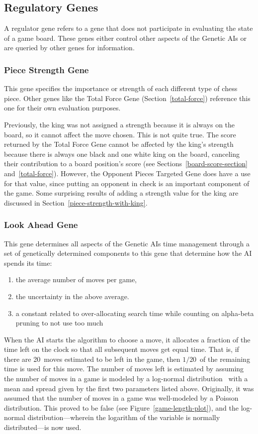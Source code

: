 \documentclass[letterpaper]{article}
\renewcommand{\_}{\allowbreak\textunderscore\allowbreak}
\begin{document}
\subsection{Regulatory Genes}
A regulator gene refers to a gene that does not participate in evaluating the state of a game board. These genes either control other aspects of the Genetic AIs or are queried by other genes for information.

\subsubsection{Piece Strength Gene}\label{piece-strength}
This gene specifies the importance or strength of each different type of chess piece. Other genes like the Total Force Gene (Section~\ref{total-force}) reference this one for their own evaluation purposes.

Previously, the king was not assigned a strength because it is always on the board, so it cannot affect the move chosen. This is not quite true. The score returned by the Total Force Gene cannot be affected by the king's strength because there is always one black and one white king on the board, canceling their contribution to a board position's score (see Sections~\ref{board-score-section} and~\ref{total-force}). However, the Opponent Pieces Targeted Gene does have a use for that value, since putting an opponent in check is an important component of the game. Some surprising results of adding a strength value for the king are discussed in Section~\ref{piece-strength-with-king}.

\subsubsection{Look Ahead Gene}
This gene determines all aspects of the Genetic AIs time management through a set of genetically determined components to this gene that determine how the AI spends its time:
\begin{enumerate}
	\item the average number of moves per game,
	\item the uncertainty in the above average.
	\item a constant related to over-allocating search time while counting on alpha-beta pruning to not use too much
\end{enumerate}
When the AI starts the algorithm to choose a move, it allocates a fraction of the time left on the clock so that all subsequent moves get equal time. That is, if there are 20~moves estimated to be left in the game, then \(1/20\)~of the remaining time is used for this move. The number of moves left is estimated by assuming the number of moves in a game is modeled by a log-normal distribution~\cite{log-norm-wiki}\cite{log-norm-chess-se} with a mean and spread given by the first two parameters listed above. Originally, it was assumed that the number of moves in a game was well-modeled by a Poisson distribution. This proved to be false (see Figure~\ref{game-length-plot}), and the log-normal distribution---wherein the logarithm of the variable is normally distributed---is now used.
\end{document}
